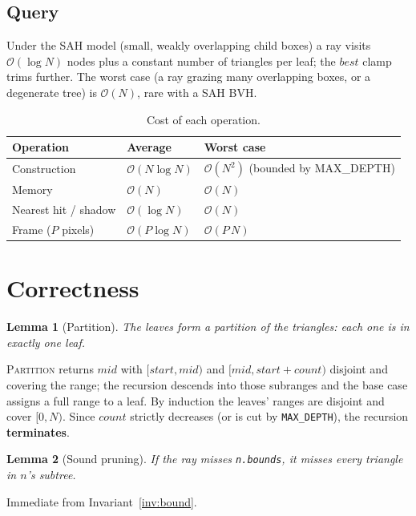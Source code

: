 \documentclass[11pt]{article}
\newtheorem{lemma}{Lemma}
\begin{document}
\subsection{Query}

Under the SAH model (small, weakly overlapping child boxes) a ray visits
$\mathcal{O}(\log N)$ nodes plus a constant number of triangles per leaf; the
$best$ clamp trims further. The worst case (a ray grazing many overlapping boxes,
or a degenerate tree) is $\mathcal{O}(N)$, rare with a SAH BVH.

\begin{table}[h]
\centering
\begin{tabular}{lll}
\toprule
Operation & Average & Worst case \\
\midrule
Construction & $\mathcal{O}(N \log N)$ & $\mathcal{O}(N^2)$ (bounded by MAX\_DEPTH) \\
Memory & $\mathcal{O}(N)$ & $\mathcal{O}(N)$ \\
Nearest hit / shadow & $\mathcal{O}(\log N)$ & $\mathcal{O}(N)$ \\
Frame ($P$ pixels) & $\mathcal{O}(P \log N)$ & $\mathcal{O}(P\,N)$ \\
\bottomrule
\end{tabular}
\caption{Cost of each operation.}
\end{table}

\section{Correctness}

\begin{lemma}[Partition]
The leaves form a partition of the triangles: each one is in exactly one leaf.
\end{lemma}
\noindent
\textsc{Partition} returns $mid$ with $[start,mid)$ and $[mid,start+count)$
disjoint and covering the range; the recursion descends into those subranges and
the base case assigns a full range to a leaf. By induction the leaves' ranges are
disjoint and cover $[0,N)$. Since $count$ strictly decreases (or is cut by
\texttt{MAX\_DEPTH}), the recursion \textbf{terminates}.

\begin{lemma}[Sound pruning]\label{lem:prune}
If the ray misses \texttt{n.bounds}, it misses every triangle in $n$'s subtree.
\end{lemma}
\noindent
Immediate from Invariant~\ref{inv:bound}.
\end{document}
